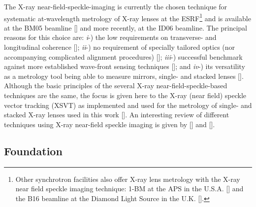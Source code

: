 \begin{refsection}
The X-ray near-field-speckle-imaging is currently the chosen technique for systematic at-wavelength metrology of X-ray lenses at the ESRF\footnote{Other synchrotron facilities also offer X-ray lens metrology with the X-ray near field speckle imaging technique: 1-BM at the APS in the U.S.A. [\cite{Qiao2020}] and the B16 beamline at the Diamond Light Source in the U.K. [\cite{Sawhney2013}].} and is available at the BM05 beamline [\cite{Berujon2020a}] and more recently, at the ID06 beamline. The principal reasons for this choice are: \textit{i}-) the low requirements on transverse- and longitudinal coherence [\cite{Zanette2014,Zdora2015,Wang2016}]; \textit{ii}-) no requirement of specially tailored optics (nor accompanying complicated alignment procedures) [\cite{Morgan2012,Wang2016}]; \textit{iii}-) successful benchmark against more established wave-front sensing techniques [\cite{Kashyap2016,Romell2017}]; and \textit{iv}-) its versatility as a metrology tool being able to measure mirrors, single- and stacked lenses [\cite{Berujon2020a}]. Although the basic principles of the several X-ray near-field-speckle-based techniques are the same, the focus is given here to the X-ray (near field) speckle vector tracking (XSVT) as implemented and used for the metrology of single- and stacked X-ray lenses used in this work [\cite{Berujon2020a,Berujon2020}]. An interesting review of different techniques using X-ray near-field speckle imaging is given by [\cite{Zdora2018a}] and [\cite{Berujon2020}].

\subsection{Foundation}\label{sec:foundation}


\end{refsection}

